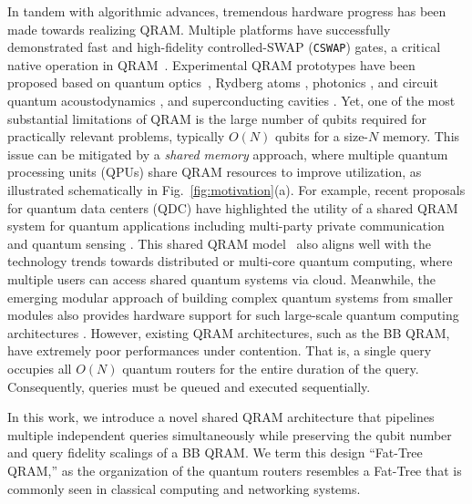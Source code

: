 In tandem with algorithmic advances, tremendous hardware progress has been made towards realizing QRAM. Multiple platforms have successfully demonstrated fast and high-fidelity controlled-SWAP (\texttt{CSWAP}) gates, a critical native operation in QRAM~\cite{xue2023hybrid,leger2024implementation,gao2019entanglement}. Experimental QRAM prototypes have been proposed based on quantum optics~\cite{jiang2019experimental}, Rydberg atoms \cite{patton2013ultrafast}, photonics \cite{chen2021teleqram}, and circuit quantum acoustodynamics \cite{hann2019hardware}, and superconducting cavities \cite{weiss2024quantum}. Yet, one of the most substantial limitations of QRAM is the large number of qubits required for practically relevant problems, typically $O(N)$ qubits for a size-$N$ memory. This issue can be mitigated by a \emph{shared memory} approach, where multiple quantum processing units (QPUs) share QRAM resources to improve utilization, as illustrated schematically in Fig.~\ref{fig:motivation}(a). For example, recent proposals for quantum data centers (QDC) \cite{liu2022quantum,liu2023data,liu2024quantum} have highlighted the utility of a shared QRAM system for quantum applications including multi-party private communication and quantum sensing \cite{liu2022quantum}. This shared QRAM model~\cite{alexeev2021quantum} also aligns well with the technology trends towards distributed or multi-core quantum computing, where multiple users can access shared quantum systems via cloud. Meanwhile, the emerging modular approach of building complex quantum systems from smaller modules also provides hardware support for such large-scale quantum computing architectures \cite{monroe2014large,bombin2021interleaving,krutyanskiy2023entanglement}. However, existing QRAM architectures, such as the BB QRAM, have extremely poor performances under contention. That is, a single query occupies all $O(N)$ quantum routers for the entire duration of the query. Consequently, queries must be queued and executed sequentially. 


In this work, we introduce a novel shared QRAM architecture that pipelines multiple independent queries simultaneously while preserving the qubit number and query fidelity scalings of a BB QRAM. We term this design ``Fat-Tree QRAM,'' as the organization of the quantum routers resembles a Fat-Tree \cite{leiserson1985fat} that is commonly seen in classical computing and networking systems. 

